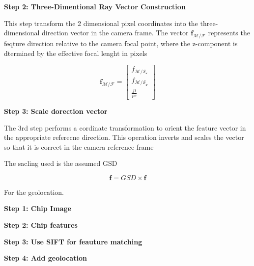 \textbf{Step 2: Three-Dimentional Ray Vector Construction}

This step transform the 2 dimensional pixel coordinates into the three-dimensional direction vector in the camera frame. The vector $\mathbf{f}_\mathcal{M/F}$ represents
the feqture direction relative to the camera focal point, where the z-component is dtermined by the effective focal lenght in pixels

\begin{equation}
    \mathbf{f}_\mathcal{M/F} = 
    \begin{bmatrix}
        f_{\mathcal{M/S_x}} \\
        f_{\mathcal{M/S_y}} \\
        \frac{fl}{ps}
    \end{bmatrix}
\end{equation}

\textbf{Step 3: Scale dorection vector}

The 3rd step performs a cordinate transformation to orient the feature vector in the appropriate referecne direction. This operation inverts and scales the vector so that it
is correct in the camera reference frame

The sacling used is the assumed GSD

\begin{equation}
    \mathbf{f} = GSD \times \mathbf{f}
\end{equation}


For the geolocation.

\textbf{Step 1: Chip Image}

\textbf{Step 2: Chip features}

\textbf{Step 3: Use SIFT for feauture matching}

\textbf{Step 4: Add geolocation}







